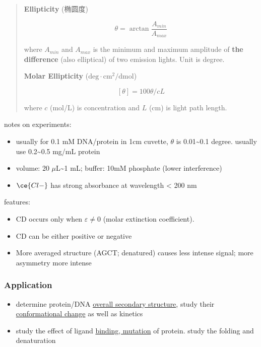 \documentclass[]{article}
\begin{document}
\begin{quote}
\textbf{Ellipticity} (椭圆度)

\[\theta=\arctan \dfrac{A_{min}}{A_{max}}\]

where \(A_{min}\) and \(A_{max}\) is the minimum and maximum amplitude
of \textbf{the difference} (also elliptical) of two emission lights.
Unit is degree.

\textbf{Molar Ellipticity} (\(\mathrm{deg\cdot cm^2/dmol}\))

\[[\theta]=100\theta/cL\]

where \(c\) (mol/L) is concentration and \(L\) (cm) is light path
length.
\end{quote}

notes on experiments:

\begin{itemize}
\item
  usually for 0.1 mM DNA/protein in 1cm cuvette, \(\theta\) is
  0.01\textasciitilde{}0.1 degree. usually use 0.2\textasciitilde{}0.5
  mg/mL protein
\item
  volume: 20 \(\mu\)L\textasciitilde{}1 mL; buffer: 10mM phosphate
  (lower interference)
\item
  \(\ce{Cl-}\) has strong absorbance at wavelength \textless{} 200 nm
\end{itemize}

features:

\begin{itemize}
\item
  CD occurs only when \(\varepsilon\neq0\) (molar extinction
  coefficient).
\item
  CD can be either positive or negative
\item
  More averaged structure (AGCT; denatured) causes less intense signal;
  more asymmetry more intense
\end{itemize}

\hypertarget{application-1}{%
\subsubsection{Application}\label{application-1}}

\begin{itemize}
\item
  determine protein/DNA \underline{overall secondary structure}, study
  their \underline{conformational change} as well as kinetics
\item
  study the effect of ligand \underline{binding, mutation} of protein.
  study the folding and denaturation
\end{itemize}
\end{document}
